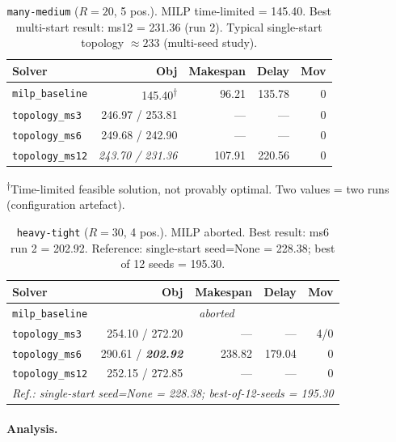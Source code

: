 \begin{table}[H]
\centering
\caption{\texttt{many-medium} ($R=20$, 5 pos.).  MILP time-limited = 145.40.
         Best multi-start result: ms12 = 231.36 (run 2).
         Typical single-start topology $\approx 233$ (multi-seed study).}
\label{tab:ms-pl20}
\begin{tabular}{lrrrr}
\toprule
Solver & Obj & Makespan & Delay & Mov \\
\midrule
\texttt{milp\_baseline}  & 145.40\textsuperscript{†} & 96.21 & 135.78 & 0 \\
\texttt{topology\_ms3}   & 246.97 / 253.81 & --- & --- & 0 \\
\texttt{topology\_ms6}   & 249.68 / 242.90 & --- & --- & 0 \\
\texttt{topology\_ms12}  & \textit{243.70 / 231.36} & 107.91 & 220.56 & 0 \\
\bottomrule
\end{tabular}
\end{table}
{\small \textsuperscript{†}Time-limited feasible solution, not provably optimal.
Two values = two runs (configuration artefact).}

\begin{table}[H]
\centering
\caption{\texttt{heavy-tight} ($R=30$, 4 pos.).  MILP aborted.
         Best result: ms6 run 2 = 202.92.
         Reference: single-start seed=None = 228.38; best of 12 seeds = 195.30.}
\label{tab:ms-pl30}
\begin{tabular}{lrrrr}
\toprule
Solver & Obj & Makespan & Delay & Mov \\
\midrule
\texttt{milp\_baseline}  & \multicolumn{4}{c}{\textit{aborted}} \\
\texttt{topology\_ms3}   & 254.10 / 272.20 & --- & --- & 4/0 \\
\texttt{topology\_ms6}   & 290.61 / \textit{\textbf{202.92}} & 238.82 & 179.04 & 0 \\
\texttt{topology\_ms12}  & 252.15 / 272.85 & --- & --- & 0 \\
\midrule
\multicolumn{5}{l}{\small\textit{Ref.: single-start seed=None = 228.38;
                                  best-of-12-seeds = 195.30}} \\
\bottomrule
\end{tabular}
\end{table}

\paragraph{Analysis.}

